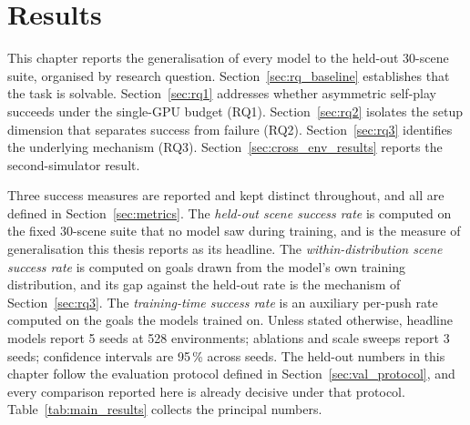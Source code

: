 \section{Results}
\label{sec:results}

This chapter reports the generalisation of every model to the held-out 30-scene
suite, organised by research question. Section~\ref{sec:rq_baseline} establishes
that the task is solvable. Section~\ref{sec:rq1} addresses whether asymmetric
self-play succeeds under the single-GPU budget (RQ1). Section~\ref{sec:rq2}
isolates the setup dimension that separates success from failure (RQ2).
Section~\ref{sec:rq3} identifies the underlying mechanism (RQ3).
Section~\ref{sec:cross_env_results} reports the second-simulator result.

Three success measures are reported and kept distinct throughout, and all are
defined in Section~\ref{sec:metrics}. The
\emph{held-out scene success rate} is computed on the fixed 30-scene suite that no
model saw during training, and is the measure of generalisation this thesis reports
as its headline. The \emph{within-distribution scene success rate} is computed on
goals drawn from the model's own training distribution, and its gap against the
held-out rate is the mechanism of Section~\ref{sec:rq3}. The \emph{training-time
success rate} is an auxiliary per-push rate computed on the goals the models
trained on. Unless stated otherwise, headline models report 5 seeds at 528
environments; ablations and scale sweeps report 3 seeds; confidence intervals are
95\,\% across seeds. The held-out numbers in this chapter follow the evaluation
protocol defined in Section~\ref{sec:val_protocol}, and every comparison reported
here is already decisive under that protocol.
Table~\ref{tab:main_results} collects the principal numbers.

